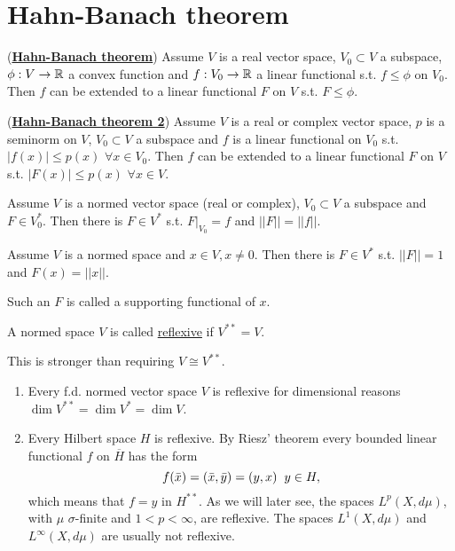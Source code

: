 \section{Hahn-Banach theorem}

\begin{theorem}(\underline{\textbf{Hahn-Banach theorem}})
    Assume $V$ is a real vector space, $V_0\subset V$ a subspace, $\phi:V\rightarrow \mathbb{R}$ a convex function and $f:V_0\rightarrow \mathbb{R}$ a linear functional
     s.t. $f\leq \phi$ on $V_0$. Then $f$ can be extended to a linear functional $F$ on $V$ s.t. $F\leq\phi$.
    
\end{theorem}

\begin{theorem}(\underline{\textbf{Hahn-Banach theorem 2}})
    Assume $V$ is a real or complex vector space, $p$ is a seminorm on $V$, $V_0\subset V$ a subspace and $f$ is a linear
    functional on $V_0$ s.t. $|f(x)|\leq p(x)$ $\forall x\in V_0$. Then $f$ can be extended to a linear functional $F$ on $V$ s.t.
    $|F(x)|\leq p(x)$ $\forall x\in V$.
\end{theorem}

\begin{corollary}
    Assume $V$ is a normed vector space (real or complex), $V_0\subset V$ a subspace and $F\in V_0^*$. Then there is $F\in V^*$ s.t.
    $\left.F\right|_{V_0}=f$ and $||F||=||f||$.
\end{corollary}

\begin{corollary}
    Assume $V$ is a normed space and $x\in V, x\neq 0$. Then there is $F\in V^*$ s.t. $||F||=1$ and $F(x) = ||x||$.
\end{corollary}
Such an $F$ is called a supporting functional of $x$.

\begin{definition}
    A normed space $V$ is called \underline{reflexive} if $V^{**}=V$.
\end{definition}
\begin{remark}
    This is stronger than requiring $V\cong V^{**}$.
\end{remark}
\begin{example}
    \begin{enumerate}
        \item Every f.d. normed vector space $V$ is reflexive for dimensional reasons $\dim V^{**} = \dim V^* = \dim V$.
        \item Every Hilbert space $H$ is reflexive. By Riesz' theorem every bounded linear functional $f$ on $\overline H$ has the form
        $$f(\bar x) = (\bar x,\bar y)=(y,x)\hspace{2mm} y\in H,$$
        which means that $f=y$ in $H^{**}$. As we will later see, the spaces $L^p(X,d\mu)$, with $\mu$ $\sigma$-finite and $1<p<\infty$, are reflexive. The
        spaces $L^1(X,d\mu)$ and $L^\infty(X,d\mu)$ are usually not reflexive.
    \end{enumerate}
\end{example}